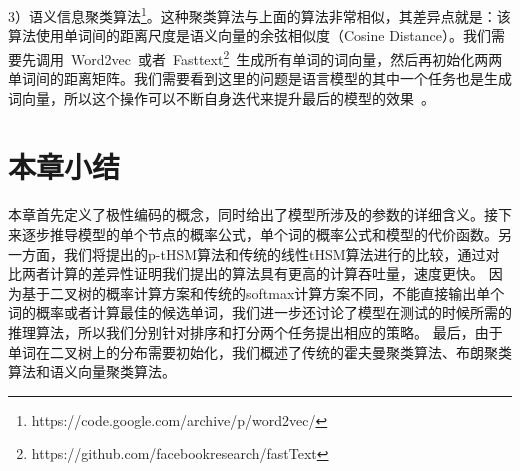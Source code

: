 3）语义信息聚类算法\footnote{https://code.google.com/archive/p/word2vec/}。这种聚类算法与上面的算法非常相似，其差异点就是：该算法使用单词间的距离尺度是语义向量的余弦相似度（Cosine Distance）。我们需要先调用~Word2vec~或者~Fasttext\footnote{https://github.com/facebookresearch/fastText}~生成所有单词的词向量，然后再初始化两两单词间的距离矩阵。我们需要看到这里的问题是语言模型的其中一个任务也是生成词向量，所以这个操作可以不断自身迭代来提升最后的模型的效果~。


\section{本章小结}
本章首先定义了极性编码的概念，同时给出了模型所涉及的参数的详细含义。接下来逐步推导模型的单个节点的概率公式，单个词的概率公式和模型的代价函数。另一方面，我们将提出的p-tHSM算法和传统的线性tHSM算法进行的比较，通过对比两者计算的差异性证明我们提出的算法具有更高的计算吞吐量，速度更快。
因为基于二叉树的概率计算方案和传统的softmax计算方案不同，不能直接输出单个词的概率或者计算最佳的候选单词，我们进一步还讨论了模型在测试的时候所需的推理算法，所以我们分别针对排序和打分两个任务提出相应的策略。
最后，由于单词在二叉树上的分布需要初始化，我们概述了传统的霍夫曼聚类算法、布朗聚类算法和语义向量聚类算法。

